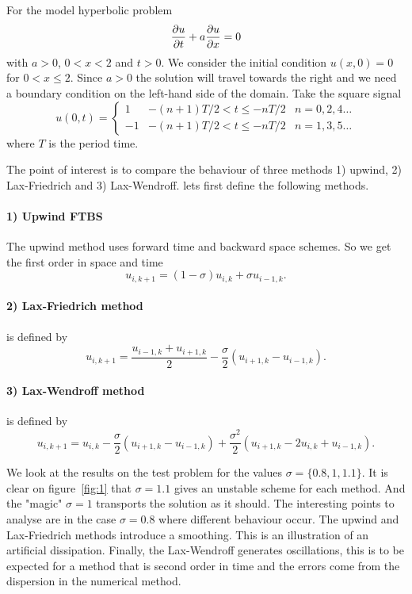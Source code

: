 
For the model hyperbolic problem 
\begin{equation}
\dfrac{\partial u}{\partial t}+a\dfrac{\partial u}{\partial x}=0
\end{equation}
with $a>0$, $0<x<2$ and $t>0$. We consider the initial condition $u(x,0)=0$ for $0<x\leq 2$. Since $a>0$ the solution will travel towards the right and we need a boundary condition on the left-hand side of the domain. Take the square signal 
$$
u(0,t)=\left\{\begin{array}{lcc}
1 & -(n+1)T/2<t\leq -nT/2 & n = 0,2,4\dots\\
-1 & -(n+1)T/2<t\leq -nT/2 & n = 1,3,5\dots
\end{array}\right.
$$
where $T$ is the period time.

The point of interest is to compare the behaviour of three methods 1) upwind, 2) Lax-Friedrich
and 3) Lax-Wendroff. lets first define the following methods.

\paragraph*{1) Upwind FTBS} The upwind method uses forward time and backward space schemes. So we get the first order in space and time 
$$u_{i,k+1}=(1-\sigma)u_{i,k}+\sigma u_{i-1,k}.$$ 


\paragraph*{2) Lax-Friedrich method} is defined by 
$$u_{i,k+1} = \dfrac{u_{i-1,k}+u_{i+1,k}}{2}-\dfrac{\sigma}{2}(u_{i+1,k}-u_{i-1,k}).$$

\paragraph*{3) Lax-Wendroff method} is defined by 
$$u_{i,k+1} = u_{i,k} -\dfrac{\sigma}{2}(u_{i+1,k}-u_{i-1,k}) +\dfrac{\sigma^2}{2}(u_{i+1,k}-2u_{i,k}+u_{i-1,k}).$$


We look at the results on the test problem for the values $\sigma = \{0.8, 1, 1.1\}$. It is clear on figure~\ref{fig:1} that $\sigma=1.1$ gives an unstable scheme for each method. And the "magic" $\sigma=1$ transports the solution as it should. The interesting points to analyse are in the case $\sigma=0.8$ where different behaviour occur. The upwind and Lax-Friedrich methods introduce a smoothing. This is an illustration of an artificial dissipation. Finally, the Lax-Wendroff generates oscillations, this is to be expected for a method that is second order in time and the errors come from the dispersion in the numerical method. 

